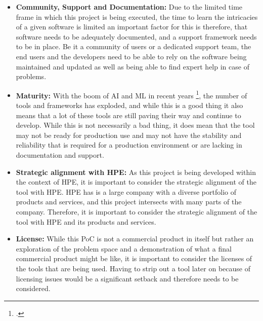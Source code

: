 \begin{itemize}

    \item \textbf{Community, Support and  Documentation:}
        Due to the limited time frame in which this project is being executed, the time to learn the intricacies of a given software is limited an important factor for this is therefore, that software needs to be adequately documented, and a support framework needs to be in place.
        Be it a community of users or a dedicated support team, the end users and the developers need to be able to rely on the software being maintained and updated as well as being able to find expert help in case of problems.

    \item \textbf{Maturity:}
        With the boom of \ac{AI} and \ac{ML} in recent years \footcite{24TopAI}, the number of tools and frameworks has exploded, and while this is a good thing it also means that a lot of these tools are still paving their way and continue to develop.
        While this is not necessarily a bad thing, it does mean that the tool may not be ready for production use and may not have the stability and reliability that is required for a production environment or are lacking in documentation and support.      

    \item \textbf{Strategic alignment with \ac{HPE}:}
        As this project is being developed within the context of \ac{HPE}, it is important to consider the strategic alignment of the tool with \ac{HPE}.
        \ac{HPE} has is a large company with a diverse portfolio of products and services, and this project intersects with many parts of the company.
        Therefore, it is important to consider the strategic alignment of the tool with \ac{HPE} and its products and services.

    \item \textbf{License:}
        \label{crit:license}
        While this \ac{PoC} is not a commercial product in itself but rather an exploration of the problem space and a demonstration of what a final commercial product  might be like,
        it is important to consider the licenses of the tools that are being used.
        Having to strip out a tool later on because of licensing issues would be a significant setback and therefore needs to be considered.


\end{itemize}
